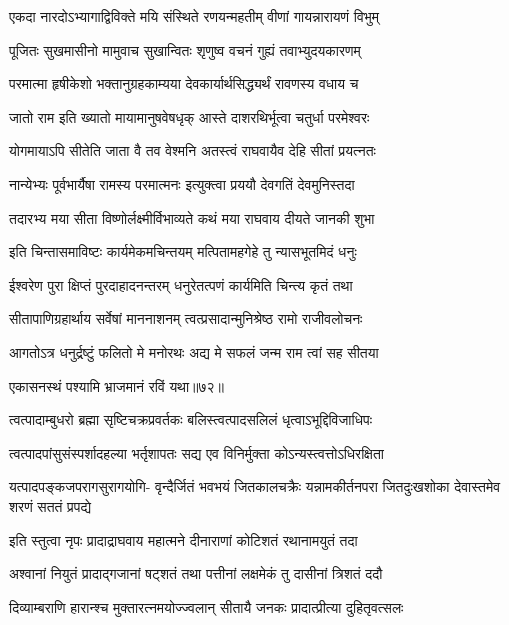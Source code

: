 \twolineshloka
{एकदा नारदोऽभ्यागाद्विविक्ते मयि संस्थिते}
{रणयन्महतीम् वीणां गायन्नारायणं विभुम्} %

\twolineshloka
{पूजितः सुखमासीनो मामुवाच सुखान्वितः}
{शृणुष्व वचनं गुह्यं तवाभ्युदयकारणम्} %

\twolineshloka
{परमात्मा हृषीकेशो भक्तानुग्रहकाम्यया}
{देवकार्यार्थसिद्ध्यर्थं रावणस्य वधाय च} %

\twolineshloka
{जातो राम इति ख्यातो मायामानुषवेषधृक्}
{आस्ते दाशरथिर्भूत्वा चतुर्धा परमेश्वरः} %

\twolineshloka
{योगमायाऽपि सीतेति जाता वै तव वेश्मनि}
{अतस्त्वं राघवायैव देहि सीतां प्रयत्नतः} %

\twolineshloka
{नान्येभ्यः पूर्वभार्यैषा रामस्य परमात्मनः}
{इत्युक्त्वा प्रययौ देवगतिं देवमुनिस्तदा} %

\twolineshloka
{तदारभ्य मया सीता विष्णोर्लक्ष्मीर्विभाव्यते}
{कथं मया राघवाय दीयते जानकी शुभा} %

\twolineshloka
{इति चिन्तासमाविष्टः कार्यमेकमचिन्तयम्}
{मत्पितामहगेहे तु न्यासभूतमिदं धनुः} %

\twolineshloka
{ईश्वरेण पुरा क्षिप्तं पुरदाहादनन्तरम्}
{धनुरेतत्पणं कार्यमिति चिन्त्य कृतं तथा} %

\twolineshloka
{सीतापाणिग्रहार्थाय सर्वेषां माननाशनम्}
{त्वत्प्रसादान्मुनिश्रेष्ठ रामो राजीवलोचनः} %

\twolineshloka
{आगतोऽत्र धनुर्द्रष्टुं फलितो मे मनोरथः}
{अद्य मे सफलं जन्म राम त्वां सह सीतया} %

{एकासनस्थं पश्यामि भ्राजमानं रविं यथा॥७२॥} %


\twolineshloka
{त्वत्पादाम्बुधरो ब्रह्मा सृष्टिचक्रप्रवर्तकः}
{बलिस्त्वत्पादसलिलं धृत्वाऽभूद्दिविजाधिपः} %

\twolineshloka
{त्वत्पादपांसुसंस्पर्शादहल्या भर्तृशापतः}
{सद्य एव विनिर्मुक्ता कोऽन्यस्त्वत्तोऽधिरक्षिता} %

\fourlineindentedshloka
{यत्पादपङ्कजपरागसुरागयोगि-}
{वृन्दैर्जितं भवभयं जितकालचक्रैः}
{यन्नामकीर्तनपरा जितदुःखशोका}
{देवास्तमेव शरणं सततं प्रपद्ये} %

\twolineshloka
{इति स्तुत्वा नृपः प्रादाद्राघवाय महात्मने}
{दीनाराणां कोटिशतं रथानामयुतं तदा} %

\twolineshloka
{अश्वानां नियुतं प्रादाद्गजानां षट्शतं तथा}
{पत्तीनां लक्षमेकं तु दासीनां त्रिशतं ददौ} %

\twolineshloka
{दिव्याम्बराणि हारान्श्च मुक्तारत्नमयोज्ज्वलान्}
{सीतायै जनकः प्रादात्प्रीत्या दुहितृवत्सलः} %

